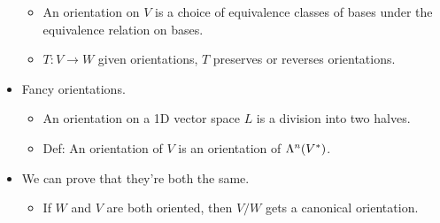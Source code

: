 \documentclass[../notes.tex]{subfiles}
\begin{document}
\begin{itemize}
\begin{itemize}
        \item An orientation on $V$ is a choice of equivalence classes of bases under the equivalence relation on bases.
        \item $T:V\to W$ given orientations, $T$ preserves or reverses orientations.
    \end{itemize}
    \item Fancy orientations.
    \begin{itemize}
        \item An orientation on a 1D vector space $L$ is a division into two halves.
        \item Def: An orientation of $V$ is an orientation of $\lam[n]{V^*}$.
    \end{itemize}
    \item We can prove that they're both the same.
    \begin{itemize}
        \item If $W$ and $V$ are both oriented, then $V/W$ gets a canonical orientation.
    \end{itemize}
\end{itemize}
\end{document}
